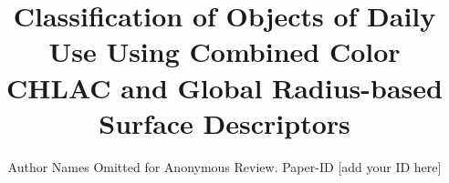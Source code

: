 \documentclass[conference]{sty/IEEEtran}
\begin{document}
\title{Classification of Objects of Daily Use Using Combined Color CHLAC and Global Radius-based Surface Descriptors}

\author{Author Names Omitted for Anonymous Review. Paper-ID [add your ID here]}





% 


\maketitle
\end{document}
